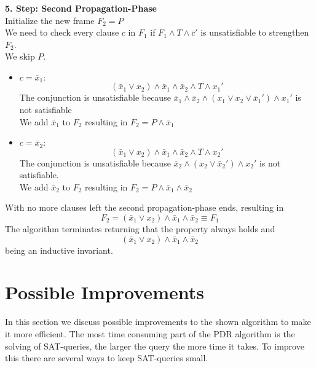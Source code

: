 \documentclass[11pt, a4paper, BCOR=10mm, ngerman]{scrbook}
\begin{document}
\textbf{5. Step: Second Propagation-Phase} \\
Initialize the new frame $F_2 = P$ \\
We need to check every clause $c$ in $F_1$ if $F_1 \land T \land \bar c'$ is unsatisfiable to strengthen $F_2$.\\ We  skip $P$. 
\begin{itemize}
\item $c = \bar x_1:$
\begin{equation*}
(\bar x_1 \lor x_2) \land \bar x_1 \land \bar x_2 \land T \land x_1'
\end{equation*}
The conjunction is unsatisfiable because $\bar x_1 \land \bar x_2 \land (x_1 \lor x_2 \lor \bar x_1') \land x_1'$ is not satisfiable \\
We add $\bar x_1$ to $F_2$ resulting in
$F_2 = P \land \bar x_1$ \\

\item $c = \bar x_2:$ 
\begin{equation*}
(\bar x_1 \lor x_2) \land \bar x_1 \land \bar x_2 \land T \land x_2'
\end{equation*}
The conjunction is unsatisfiable because $\bar x_2 \land (x_2 \lor \bar x_2') \land x_2'$ is not satisfiable. \\
We add $\bar x_2$ to $F_2$ resulting in
$F_2 = P \land \bar x_1 \land \bar x_2$

\end{itemize}

With no more clauses left the second propagation-phase ends, resulting in 
\begin{equation*}
F_2 = (\bar x_1 \lor x_2) \land \bar x_1 \land \bar x_2 \equiv F_1
\end{equation*}
The algorithm terminates returning that the property always holds and
\begin{equation*}
(\bar x_1 \lor x_2) \land \bar x_1 \land \bar x_2
\end{equation*}
 being an inductive invariant.

\section{Possible Improvements}
In this section we discuss possible improvements to the shown algorithm to make it more efficient. The most time consuming part of the PDR algorithm is the solving of SAT-queries, the larger the query the more time it takes. To improve this there are several ways to keep SAT-queries small.
\end{document}
